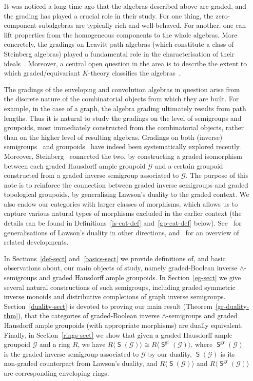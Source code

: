 \documentclass[a4paper,reqno,12pt]{amsart}
\numberwithin{equation}{section}
\theoremstyle{plain}
\theoremstyle{definition}
\newcommand{\gr}{\operatorname{gr}}
\newcommand{\SG}{\operatorname{\mathsf{S}}}
\begin{document}
It was noticed a long time ago that the algebras described above are graded, and the grading has played a crucial role in their study. For one thing, the zero-component subalgebras are typically rich and well-behaved. For another, one can lift properties from the homogeneous components to the whole algebras. More concretely, the gradings on Leavitt path algebras (which constitute a class of Steinberg algebras) played a fundamental role in the characterisation of their ideals~\cite{AAS}. Moreover, a central open question in the area is to describe the extent to which graded/equivariant $K$-theory classifies the algebras~\cite{GGG}. 

The gradings of the enveloping and convolution algebras in question arise from the discrete nature of the combinatorial objects from which they are built. For example, in the case of a graph, the algebra grading ultimately results from path lengths. Thus it is natural to study the gradings on the level of semigroups and groupoids, most immediately constructed from the combinatorial objects, rather than on the higher level of resulting algebras. Gradings on both (inverse) semigroups~\cite{RZ} and groupoids~\cite{arasims,chr19} have indeed been systematically explored recently. Moreover, Steinberg~\cite{steinberg}  connected the two, by constructing a graded isomorphism between each graded Hausdorff ample groupoid $\mathscr{G}$ and a certain groupoid constructed from a graded inverse semigroup associated to $\mathscr{G}$. The purpose of this note is to reinforce the connection between graded inverse semigroups and graded topological groupoids, by generalising Lawson's duality to the graded context. We also endow our categories with larger classes of morphisms, which allows us to capture various natural types of morphisms excluded in the earlier context (the details can be found in Definitions~\ref{is-cat-def} and~\ref{gp-cat-def} below). See~\cite{Bice,BS,CG,KL1,KL2,LL,resende} for generalisations of Lawson's duality in other directions, and~\cite{kudryavtseva} for an overview of related developments.

In Sections~\ref{def-sect} and~\ref{basics-sect} we provide definitions of, and basic observations about, our main objects of study, namely graded-Boolean inverse $\land$-semigroups and graded Hausdorff ample groupoids. In Section~\ref{eg-sect} we give several natural constructions of such semigroups, including graded symmetric inverse monoids and distributive completions of graph inverse semigroups. Section~\ref{duality-sect} is devoted to proving our main result (Theorem~\ref{gr-duality-thm}), that the categories of graded-Boolean inverse $\land$-semigroups and graded Hausdorff ample groupoids (with appropriate morphisms) are dually equivalent. Finally, in Section~\ref{rings-sect} we show that given a graded Hausdorff ample groupoid $\mathscr{G}$ and a ring $R$, we have $R\langle \SG(\mathscr{G}) \rangle \cong R\langle \SG^{\gr}(\mathscr{G}) \rangle$, where $\SG^{\gr}(\mathscr{G})$ is the graded inverse semigroup associated to $\mathscr{G}$ by our duality, $\SG(\mathscr{G})$ is its non-graded counterpart from Lawson's duality, and $R\langle \SG(\mathscr{G}) \rangle$ and $R\langle \SG^{\gr}(\mathscr{G}) \rangle$ are corresponding enveloping rings.
\end{document}
